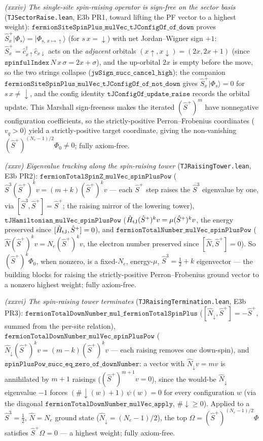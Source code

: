 \documentclass[a4paper,11pt]{article}
\begin{document}
\emph{(xxxiv) The single-site spin-raising operator is sign-free on the sector basis}
(\texttt{TJSectorRaise.lean}, E3b PR1, toward lifting the PF vector to a highest weight):
$\texttt{fermionSiteSpinPlus\_mulVec\_tJConfigOf\_of\_down}$ proves $\hat S^+_x|\Phi_s\rangle =
|\Phi_{s,\,x\mapsto\uparrow}\rangle$ (for $s\,x=\downarrow$) with net Jordan--Wigner sign $+1$:
$\hat S^+_x=\hat c^\dagger_{x\uparrow}\hat c_{x\downarrow}$ acts on the \emph{adjacent} orbitals
$(x\uparrow,x\downarrow)=(2x,2x+1)$ (since $\texttt{spinfulIndex}\,N\,x\,\sigma=2x+\sigma$), and the
up-orbital $2x$ is empty before the move, so the two strings collapse
($\texttt{jwSign\_succ\_cancel\_high}$); the companion
$\texttt{fermionSiteSpinPlus\_mulVec\_tJConfigOf\_of\_not\_down}$ gives $\hat S^+_x|\Phi_s\rangle=0$
for $s\,x\neq\downarrow$, and the config identity $\texttt{tJConfigOf\_update\_raise}$ records the
orbital update.  This Marshall sign-freeness makes the iterated $(\hat S^+)^m$ have nonnegative
configuration coefficients, so the strictly-positive Perron--Frobenius coordinates ($v_q>0$) yield a
strictly-positive target coordinate, giving the non-vanishing $(\hat S^+)^{(N_e-1)/2}\Phi_0\neq 0$;
fully axiom-free.

\emph{(xxxv) Eigenvalue tracking along the spin-raising tower} (\texttt{TJRaisingTower.lean}, E3b
PR2): $\texttt{fermionTotalSpinZ\_mulVec\_spinPlusPow}$ ($\hat S^3 (\hat S^+)^k v = (m+k)(\hat
S^+)^k v$ --- each $\hat S^+$ step raises the $\hat S^3$ eigenvalue by one, via $[\hat S^3,\hat
S^+]=\hat S^+$; the raising mirror of the lowering tower),
$\texttt{tJHamiltonian\_mulVec\_spinPlusPow}$ ($\hat H_{\rm tJ}(\hat S^+)^k v=\mu(\hat S^+)^k v$, the
energy preserved since $[\hat H_{\rm tJ},\hat S^+]=0$), and
$\texttt{fermionTotalNumber\_mulVec\_spinPlusPow}$ ($\hat N(\hat S^+)^k v=N_e(\hat S^+)^k v$, the
electron number preserved since $[\hat N,\hat S^+]=0$).  So $(\hat S^+)^k\Phi_0$, when nonzero, is a
fixed-$N_e$, energy-$\mu$, $\hat S^3=\tfrac12+k$ eigenvector --- the building blocks for raising the
strictly-positive Perron--Frobenius ground vector to a nonzero highest weight; fully axiom-free.

\emph{(xxxvi) The spin-raising tower terminates} (\texttt{TJRaisingTermination.lean}, E3b PR3):
$\texttt{fermionTotalDownNumber\_mul\_fermionTotalSpinPlus}$ ($[\hat N_\downarrow,\hat S^+]=-\hat
S^+$, summed from the per-site relation), $\texttt{fermionTotalDownNumber\_mulVec\_spinPlusPow}$
($\hat N_\downarrow(\hat S^+)^k v=(m-k)(\hat S^+)^k v$ --- each raising removes one down-spin), and
$\texttt{spinPlusPow\_succ\_eq\_zero\_of\_downNumber}$: a vector with $\hat N_\downarrow v=m v$ is
annihilated by $m+1$ raisings ($(\hat S^+)^{m+1}v=0$), since the would-be $\hat N_\downarrow$
eigenvalue $-1$ forces $(\#{\downarrow}(w)+1)\,\psi(w)=0$ for every configuration $w$ (via the
diagonal $\texttt{fermionTotalDownNumber\_mulVec\_apply}$, $\#{\downarrow}\ge 0$).  Applied to a
$\hat S^3=\tfrac12$, $\hat N=N_e$ ground state ($\hat N_\downarrow=(N_e-1)/2$), the top
$\Omega=(\hat S^+)^{(N_e-1)/2}\Phi$ satisfies $\hat S^+\Omega=0$ --- a highest weight; fully
axiom-free.
\end{document}

